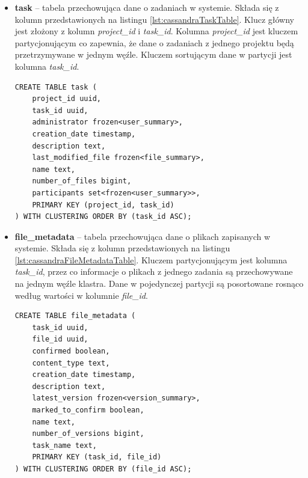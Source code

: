 \begin{itemize}
    \item \textbf{task} -- tabela przechowująca dane o zadaniach w systemie.
    Składa się z kolumn przedstawionych na listingu \ref{lst:cassandraTaskTable}.
    Klucz główny jest złożony z kolumn \textit{project\_id} i \textit{task\_id}. 
    Kolumna \textit{project\_id} jest kluczem partycjonującym co zapewnia, że dane o zadaniach z jednego projektu będą przetrzymywane w jednym węźle.
    Kluczem sortującym dane w partycji jest kolumna \textit{task\_id}.
    
    \begin{minipage}{\linewidth}
    \begin{lstlisting}[language=CQL,caption={Definicja tabeli \textit{task}},label={lst:cassandraTaskTable}]
CREATE TABLE task (
    project_id uuid,
    task_id uuid,
    administrator frozen<user_summary>,
    creation_date timestamp,
    description text,
    last_modified_file frozen<file_summary>,
    name text,
    number_of_files bigint,
    participants set<frozen<user_summary>>,
    PRIMARY KEY (project_id, task_id)
) WITH CLUSTERING ORDER BY (task_id ASC);
    \end{lstlisting}
    \end{minipage}
    
    \item \textbf{file\_metadata} -- tabela przechowująca dane o plikach zapisanych w systemie.
    Składa się z kolumn przedstawionych na listingu \ref{lst:cassandraFileMetadataTable}.
    Kluczem partycjonującym jest kolumna \textit{task\_id}, przez co informacje o plikach z jednego zadania są przechowywane na jednym węźle klastra.
    Dane w pojedynczej partycji są posortowane rosnąco według wartości w kolumnie \textit{file\_id}.
    
    \begin{minipage}{\linewidth}
    \begin{lstlisting}[language=CQL,caption={Definicja tabeli \textit{file\_metadata}},label={lst:cassandraFileMetadataTable}]
CREATE TABLE file_metadata (
    task_id uuid,
    file_id uuid,
    confirmed boolean,
    content_type text,
    creation_date timestamp,
    description text,
    latest_version frozen<version_summary>,
    marked_to_confirm boolean,
    name text,
    number_of_versions bigint,
    task_name text,
    PRIMARY KEY (task_id, file_id)
) WITH CLUSTERING ORDER BY (file_id ASC);
    \end{lstlisting}
    \end{minipage}
    

\end{itemize}
